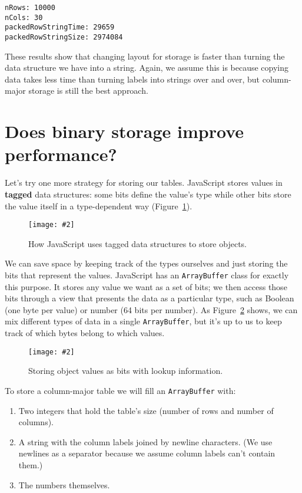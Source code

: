 \documentclass[krantzl]{krantz}
\newcommand{\figpdf}[4]{\begin{figure}%
\centering%
\texttt{[image: \#2]}%
\caption{#3}%
\label{#1}%
\end{figure}}
\newcommand{\figref}[1]{Figure~\ref{#1}}
\newcommand{\glossref}[1]{\textbf{#1}}
\begin{document}
\begin{lstlisting}[frame=tblr,backgroundcolor=\color{black!5}]
nRows: 10000
nCols: 30
packedRowStringTime: 29659
packedRowStringSize: 2974084
\end{lstlisting}



These results show that changing layout for storage
is faster than turning the data structure we have into a string.
Again,
we assume this is because copying data takes less time than turning labels into strings over and over,
but column-major storage is still the best approach.

\section{Does binary storage improve performance?}\label{data-table-binary}


Let’s try one more strategy for storing our tables.
JavaScript stores values in \glossref{tagged} data structures:
some bits define the value’s type
while other bits store the value itself in a type-dependent way
(\figref{data-table-object-storage}).

\figpdf{data-table-object-storage}{./data-table/object-storage.pdf}{How JavaScript uses tagged data structures to store objects.}{0.6}


We can save space by keeping track of the types ourselves
and just storing the bits that represent the values.
JavaScript has an \texttt{ArrayBuffer} class for exactly this purpose.
It stores any value we want as a set of bits;
we then access those bits through a view that presents the data as a particular type,
such as Boolean (one byte per value) or number (64 bits per number).
As \figref{data-table-packed-storage} shows,
we can mix different types of data in a single \texttt{ArrayBuffer},
but it’s up to us to keep track of which bytes belong to which values.

\figpdf{data-table-packed-storage}{./data-table/packed-storage.pdf}{Storing object values as bits with lookup information.}{0.6}


To store a column-major table we will fill an \texttt{ArrayBuffer} with:

\begin{enumerate}

\item 

Two integers that hold the table’s size (number of rows and number of columns).



\item 

A string with the column labels joined by newline characters.
    (We use newlines as a separator because we assume column labels can’t contain them.)



\item 

The numbers themselves.



\end{enumerate}
\end{document}
